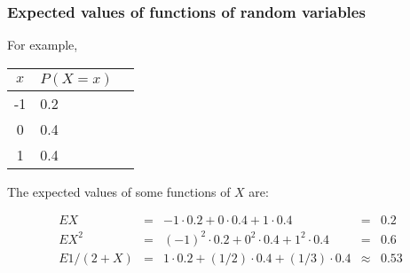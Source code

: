 \begin{frame}
\frametitle{Expected values of functions of random variables}

For example,

\begin{center}
\begin{tabular}{cll}
{$x$} & {$P(X=x)$}\\\hline 
-1 & \hspace{0.8cm}0.2\\
 0 & \hspace{0.8cm}0.4\\
 1 & \hspace{0.8cm}0.4\\\hline
\end{tabular}
\end{center}

The expected values of some functions of $X$ are:

$$
\begin{array}{ccccc}
EX &=& -1\cdot 0.2 + 0\cdot 0.4 + 1\cdot 0.4 &=& 0.2\\
EX^2 &=& (-1)^2\cdot 0.2 + 0^2\cdot 0.4 + 1^2\cdot 0.4 &=& 0.6\\
E1/(2+X) &=& 1\cdot 0.2 + (1/2)\cdot 0.4 + (1/3)\cdot 0.4 &\approx& 0.53  
\end{array}
$$

\end{frame}


